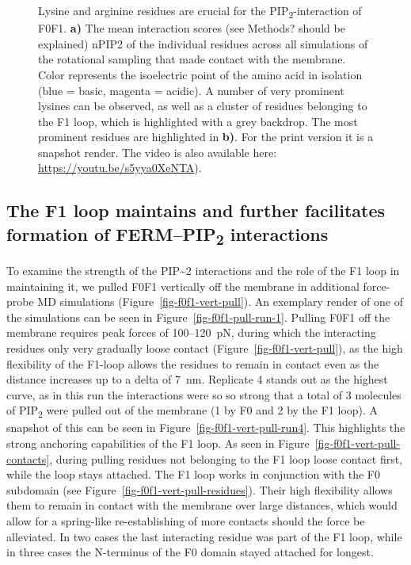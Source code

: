 \documentclass[
  twocolumn]{biophys-new-mod}
\begin{document}
\begin{figure}
\begin{minipage}[t]{\linewidth}
{}

\subcaption{\label{fig-f1f1-residues}~}
\end{minipage}%

\caption{\label{fig-f0f1-residues}Lysine and arginine residues are
crucial for the PIP\textsubscript{2}-interaction of F0F1. \textbf{a)}
The mean interaction scores (see Methods? should be explained) nPIP2 of the individual residues across all
simulations of the rotational sampling that made contact with the
membrane. Color represents the isoelectric point of the amino acid in
isolation (blue = basic, magenta = acidic). A number of very prominent
lysines can be observed, as well as a cluster of residues belonging to
the F1 loop, which is highlighted with a grey backdrop. The most
prominent residues are highlighted in \textbf{b)}. For the print version
it is a snapshot render. The video is also available here:
\url{https://youtu.be/s5yya0XeNTA}).}

\end{figure}

\hypertarget{the-f1-loop-maintains-and-further-facilitates-formation-of-fermpip2-interactions}{%
\subsection{\texorpdfstring{The F1 loop maintains and further
facilitates formation of FERM--PIP\textsubscript{2}
interactions}{The F1 loop maintains and further facilitates formation of FERM--PIP2 interactions}}\label{the-f1-loop-maintains-and-further-facilitates-formation-of-fermpip2-interactions}}

To examine the strength of the PIP\textasciitilde2 interactions and the
role of the F1 loop in maintaining it, we pulled F0F1 vertically off the
membrane in additional force-probe MD simulations
(Figure~\ref{fig-f0f1-vert-pull}). An exemplary render of one of the
simulations can be seen in Figure~\ref{fig-f0f1-pull-run-1}. Pulling
F0F1 off the membrane requires peak forces of 100--120~pN, during which
the interacting residues only very gradually loose contact
(Figure~\ref{fig-f0f1-vert-pull}), as the high flexibility of the F1-loop
allows the residues to remain in contact even as the distance increases
up to a delta of 7~nm. Replicate 4 stands out as the highest curve, as
in this run the interactions were so so strong that a total of 3
molecules of PIP\textsubscript{2} were pulled out of the membrane (1 by
F0 and 2 by the F1 loop). A snapshot of this
can be seen in Figure~\ref{fig-f0f1-vert-pull-run4}. This highlights the strong anchoring capabilities of the F1 loop. 
As
seen in Figure~\ref{fig-f0f1-vert-pull-contacts}, during pulling
residues not belonging to the F1 loop loose contact first, while the
loop stays attached. The F1 loop works in conjunction with the F0
subdomain (see Figure~\ref{fig-f0f1-vert-pull-residues}). Their high
flexibility allows them to remain in contact with the membrane over
large distances, which would allow for a spring-like re-establishing of
more contacts should the force be alleviated. In two cases the last
interacting residue was part of the F1 loop, while in three cases the
N-terminus of the F0 domain stayed attached for longest.
\end{document}
